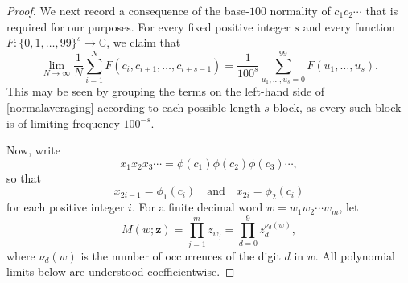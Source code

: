 \documentclass[12pt]{article}
\begin{document}
\begin{proof}
 We next record a consequence of the base-$100$ normality of
$c_1c_2\cdots$ that is required for our purposes. For every fixed positive
integer $s$ and every function
$F\colon\{0,1,\ldots,99\}^{s}\longrightarrow\mathbb C$, we claim that 
\begin{equation}\label{normalaveraging}
 \lim_{N\to\infty}\frac{1}{N}
 \sum_{i=1}^{N}F(c_i,c_{i+1},\ldots,c_{i+s-1}) =\frac{1}{100^{s}}
 \sum_{u_1,\ldots,u_s=0}^{99}F(u_1,\ldots,u_s). 
\end{equation} 
 This may be seen by grouping the terms on the left-hand side 
 of \eqref{normalaveraging}
 according to each possible
length-$s$ block, as every such block is of limiting frequency $100^{-s}$. 
 
 Now, write $$  x_1 x_2 x_3 \cdots=\phi(c_1)\phi(c_2)\phi(c_3)\cdots, $$ so that
\begin{equation}\label{xcoordinates}
 x_{2i-1}=\phi_1(c_i)
 \quad\text{and}\quad
 x_{2i}=\phi_2(c_i) 
\end{equation} 
 for each positive integer $i$. 
For a finite decimal word $w=w_1w_2\cdots w_m$, let
\begin{equation}\label{defineM}
 M(w;\mathbf z)
 =\prod_{j=1}^{m}z_{w_j}
 =\prod_{d=0}^{9}z_d^{\nu_d(w)},
\end{equation}
where $\nu_d(w)$ is the number of occurrences of the digit $d$ in $w$.
All polynomial limits below are understood coefficientwise.


\end{proof}
\end{document}

